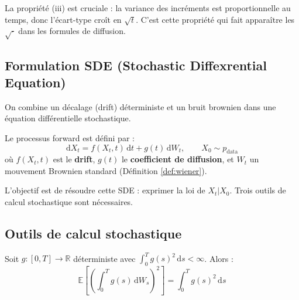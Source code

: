 \documentclass[12pt]{article}
\begin{document}
La propriété (iii) est cruciale : la variance des incréments est proportionnelle au temps, donc l'écart-type croît en $\sqrt{t}$. C'est cette propriété qui fait apparaître les $\sqrt{\cdot}$ dans les formules de diffusion.

\subsection{Formulation SDE (Stochastic Diffexrential Equation)}

On combine un décalage (drift) déterministe et un bruit brownien dans une équation différentielle stochastique.

\begin{definitionbox}
\label{def:sde}
Le processus forward est défini par :
\begin{equation}
    \boxed{\mathrm{d}X_t = f(X_t, t)\,\mathrm{d}t + g(t)\,\mathrm{d}W_t, \qquad X_0 \sim p_{\text{data}}}
    \label{eq:sde_forward}
\end{equation}
où $f(X_t, t)$ est le \textbf{drift}, $g(t)$ le \textbf{coefficient de diffusion}, et $W_t$ un mouvement Brownien standard (Définition \ref{def:wiener}).
\end{definitionbox}

L'objectif est de résoudre cette SDE : exprimer la loi de $X_t | X_0$. Trois outils de calcul stochastique sont nécessaires.

\subsection{Outils de calcul stochastique}

\begin{propositionbox}
\label{prop:ito}
Soit $g : [0,T] \to \mathbb{R}$ déterministe avec $\int_0^T g(s)^2\, \mathrm{d}s < \infty$. Alors :
\begin{equation}
    \mathbb{E}\!\left[\left(\int_0^T g(s)\, \mathrm{d}W_s\right)^{\!2}\right] = \int_0^T g(s)^2\, \mathrm{d}s
    \label{eq:ito_isometry}
\end{equation}
\end{propositionbox}
\end{document}
